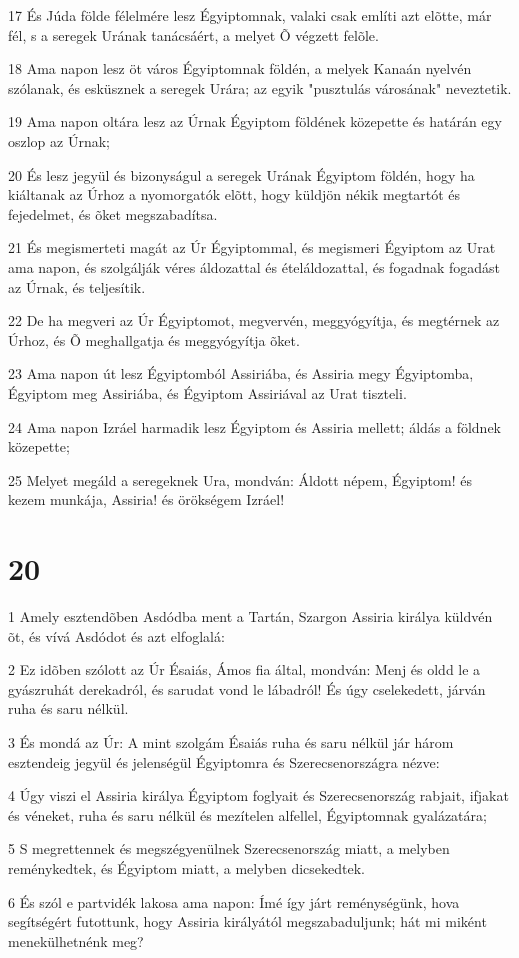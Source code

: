 \par 17 És Júda földe félelmére lesz Égyiptomnak, valaki csak említi azt elõtte, már fél, s a seregek Urának tanácsáért, a melyet Õ végzett felõle.
\par 18 Ama napon lesz öt város Égyiptomnak földén, a melyek Kanaán nyelvén szólanak, és esküsznek a seregek Urára; az egyik "pusztulás városának" neveztetik.
\par 19 Ama napon oltára lesz az Úrnak Égyiptom földének közepette és határán egy oszlop az Úrnak;
\par 20 És lesz jegyül és bizonyságul a seregek Urának Égyiptom földén, hogy ha kiáltanak az Úrhoz a nyomorgatók elõtt, hogy küldjön nékik megtartót és fejedelmet, és õket megszabadítsa.
\par 21 És megismerteti magát az Úr Égyiptommal, és megismeri Égyiptom az Urat ama napon, és szolgálják véres áldozattal és ételáldozattal, és fogadnak fogadást az Úrnak, és teljesítik.
\par 22 De ha megveri az Úr Égyiptomot, megvervén, meggyógyítja, és megtérnek az Úrhoz, és Õ meghallgatja és meggyógyítja õket.
\par 23 Ama napon út lesz Égyiptomból Assiriába, és Assiria megy Égyiptomba, Égyiptom meg Assiriába, és Égyiptom Assiriával az Urat tiszteli.
\par 24 Ama napon Izráel harmadik lesz Égyiptom és Assiria mellett; áldás a földnek közepette;
\par 25 Melyet megáld a seregeknek Ura, mondván: Áldott népem, Égyiptom! és kezem munkája, Assiria! és örökségem Izráel!

\chapter{20}

\par 1 Amely esztendõben Asdódba ment a Tartán, Szargon Assiria királya küldvén õt, és vívá Asdódot és azt elfoglalá:
\par 2 Ez idõben szólott az Úr Ésaiás, Ámos fia által, mondván: Menj és oldd le a gyászruhát derekadról, és sarudat vond le lábadról! És úgy cselekedett, járván ruha és saru nélkül.
\par 3 És mondá az Úr: A mint szolgám Ésaiás ruha és saru nélkül jár három esztendeig jegyül és jelenségül Égyiptomra és Szerecsenországra nézve:
\par 4 Úgy viszi el Assiria királya Égyiptom foglyait és Szerecsenország rabjait, ifjakat és véneket, ruha és saru nélkül és mezítelen alfellel, Égyiptomnak gyalázatára;
\par 5 S megrettennek és megszégyenülnek Szerecsenország miatt, a melyben reménykedtek, és Égyiptom miatt, a melyben dicsekedtek.
\par 6 És szól e partvidék lakosa ama napon: Ímé így járt reménységünk, hova segítségért futottunk, hogy Assiria királyától megszabaduljunk; hát mi miként menekülhetnénk meg?

